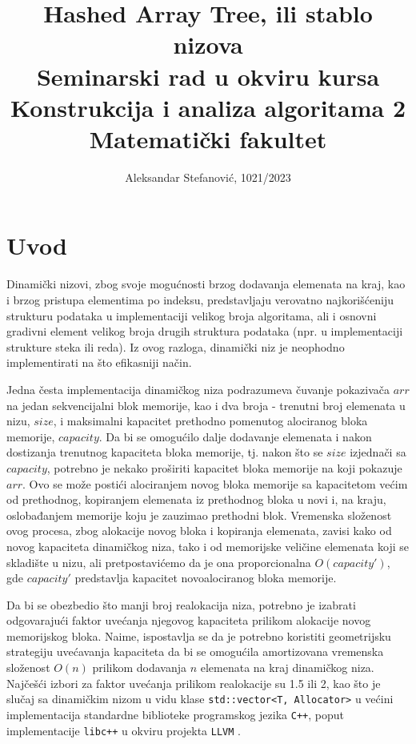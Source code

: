 \documentclass[a4paper]{article}
\title{Hashed Array Tree, ili stablo nizova\\ \small{Seminarski rad u okviru kursa\\Konstrukcija i analiza algoritama 2\\ Matematički fakultet}}
\author{Aleksandar Stefanović, 1021/2023}
\begin{document}
\maketitle

\begin{abstract}

\end{abstract}

\tableofcontents

\newpage

\section{Uvod}

Dinamički nizovi, zbog svoje mogućnosti brzog dodavanja elemenata na kraj, kao i brzog pristupa elementima po indeksu, predstavljaju verovatno najkorišćeniju strukturu podataka u implementaciji velikog broja algoritama, ali i osnovni gradivni element velikog broja drugih struktura podataka (npr. u implementaciji strukture steka ili reda). Iz ovog razloga, dinamički niz je neophodno implementirati na što efikasniji način.

Jedna česta implementacija dinamičkog niza podrazumeva čuvanje pokazivača $arr$ na jedan sekvencijalni blok memorije, kao i dva broja - trenutni broj elemenata u nizu, $size$, i maksimalni kapacitet prethodno pomenutog alociranog bloka memorije, $capacity$. Da bi se omogućilo dalje dodavanje elemenata i nakon dostizanja trenutnog kapaciteta bloka memorije, tj. nakon što se $size$ izjednači sa $capacity$, potrebno je nekako proširiti kapacitet bloka memorije na koji pokazuje $arr$. Ovo se može postići alociranjem novog bloka memorije sa kapacitetom većim od prethodnog, kopiranjem elemenata iz prethodnog bloka u novi i, na kraju, oslobađanjem memorije koju je zauzimao prethodni blok. Vremenska složenost ovog procesa, zbog alokacije novog bloka i kopiranja elemenata, zavisi kako od novog kapaciteta dinamičkog niza, tako i od memorijske veličine elemenata koji se skladište u nizu, ali pretpostavićemo da je ona proporcionalna $O(capacity')$, gde $capacity'$ predstavlja kapacitet novoalociranog bloka memorije.

Da bi se obezbedio što manji broj realokacija niza, potrebno je izabrati odgovarajući faktor uvećanja njegovog kapaciteta prilikom alokacije novog memorijskog bloka. Naime, ispostavlja se da je potrebno koristiti geometrijsku strategiju uvećavanja kapaciteta da bi se omogućila amortizovana vremenska složenost $O(n)$ prilikom dodavanja $n$ elemenata na kraj dinamičkog niza. Najčešći izbori za faktor uvećanja prilikom realokacije su 1.5 ili 2, kao što je slučaj sa dinamičkim nizom u vidu klase \verb|std::vector<T, Allocator>| u većini implementacija standardne biblioteke programskog jezika \verb|C++|, poput implementacije \verb|libc++| u okviru projekta \verb|LLVM| \cite{libcxx-vector-growth}.
\end{document}
